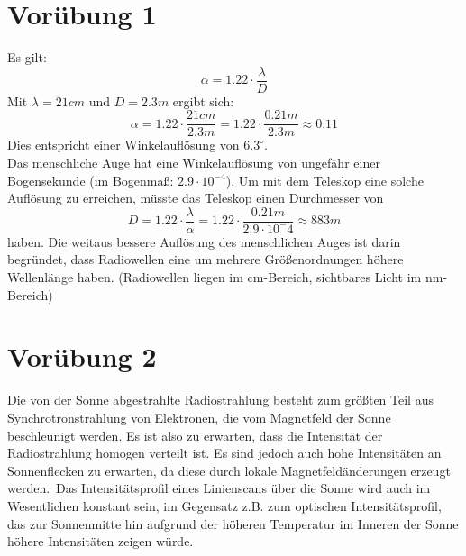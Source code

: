 \documentclass[titlepage]{scrartcl}
\begin{document}
\section{Vorübung 1}
Es gilt:
\begin{equation}
\alpha = 1.22\cdot\frac{\lambda}{D}
\end{equation}
Mit $\lambda=21 cm$ und $D=2.3 m$ ergibt sich:
\begin{equation}
\alpha = 1.22\cdot\frac{21 cm}{2.3 m} = 1.22\cdot\frac{0.21 m}{2.3 m} \approx 0.11
\end{equation}
Dies entspricht einer Winkelauflösung von $6.3^\circ$.
\\
Das menschliche Auge hat eine Winkelauflösung von ungefähr einer Bogensekunde (im Bogenmaß: $2.9\cdot10^{-4}$). Um mit dem Teleskop eine solche Auflösung zu erreichen, müsste das Teleskop einen Durchmesser von
\begin{equation}
D = 1.22\cdot\frac{\lambda}{\alpha} = 1.22\cdot\frac{0.21 m}{2.9\cdot10^-4} \approx 883 m
\end{equation}
haben. Die weitaus bessere Auflösung des menschlichen Auges ist darin begründet, dass Radiowellen eine um mehrere Größenordnungen höhere Wellenlänge haben. (Radiowellen liegen im cm-Bereich, sichtbares Licht im nm-Bereich)
\section{Vorübung 2}
Die von der Sonne abgestrahlte Radiostrahlung besteht zum größten Teil aus Synchrotronstrahlung von Elektronen, die vom Magnetfeld der Sonne beschleunigt werden. Es ist also zu erwarten, dass die Intensität der Radiostrahlung homogen verteilt ist. Es sind jedoch auch hohe Intensitäten an Sonnenflecken zu erwarten, da diese durch lokale Magnetfeldänderungen erzeugt werden.\
Das Intensitätsprofil eines Linienscans über die Sonne wird auch im Wesentlichen konstant sein, im Gegensatz z.B. zum optischen Intensitätsprofil, das zur Sonnenmitte hin aufgrund der höheren Temperatur im Inneren der Sonne höhere Intensitäten zeigen würde.
\end{document}
